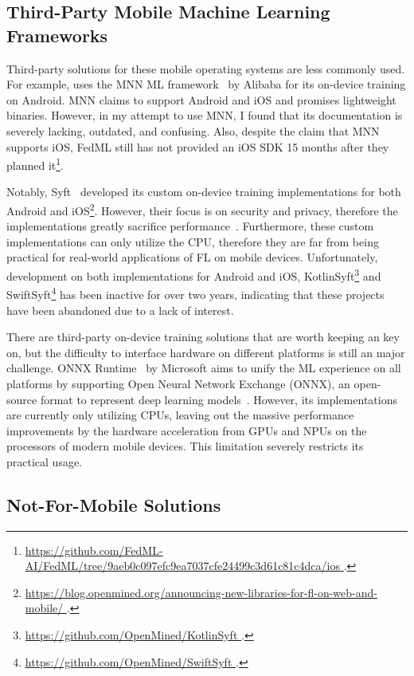 \documentclass[conference]{IEEEtran}
\begin{document}
\subsection{Third-Party Mobile Machine Learning Frameworks}

Third-party solutions for these mobile operating systems are less commonly used.
For example, \FedML{} uses
the MNN ML framework~\cite{jiang2020mnn,lv2022walle} by Alibaba for
its on-device training on Android.
MNN claims to support Android and iOS and promises lightweight binaries.
However, in my attempt to use MNN, I found that its documentation is
severely lacking, outdated, and confusing.
Also, despite the claim that MNN supports iOS,
FedML still has not provided an iOS SDK 15 months after they planned
it\footnote{\url{
    https://github.com/FedML-AI/FedML/tree/9aeb0c097efc9ea7037cfe24499c3d61c81c4dca/ios
}.}.

Notably, Syft~\cite{ryffel2018generic,Ziller2021,hall2021syft} developed
its custom on-device training implementations for
both Android and iOS\footnote{\url{
    https://blog.openmined.org/announcing-new-libraries-for-fl-on-web-and-mobile/
}.}.
However, their focus is on security and privacy,
therefore the implementations greatly sacrifice
performance~\cite{ryffel2018generic}.
Furthermore, these custom implementations can only utilize the CPU,
therefore they are far from being practical for real-world applications of
FL on mobile devices.
Unfortunately, development on
both implementations for Android and iOS,
KotlinSyft\footnote{\url{
    https://github.com/OpenMined/KotlinSyft
}.} and SwiftSyft\footnote{\url{
    https://github.com/OpenMined/SwiftSyft
}.} has been inactive for over two years,
indicating that these projects have been abandoned due to a lack of interest.

There are third-party on-device training solutions that are worth keeping an key on,
but the difficulty to interface hardware on different platforms is
still an major challenge.
ONNX Runtime~\cite{onnxruntime} by Microsoft aims to
unify the ML experience on all platforms by
supporting Open Neural Network Exchange (ONNX),
an open-source format to represent deep learning
models~\cite{ParedesdelRio2020}.
However, its implementations are currently only utilizing CPUs,
leaving out the massive performance improvements by the hardware acceleration
from GPUs and NPUs on the processors of modern mobile devices.
This limitation severely restricts its practical usage.

\subsection{Not-For-Mobile Solutions}
\end{document}
